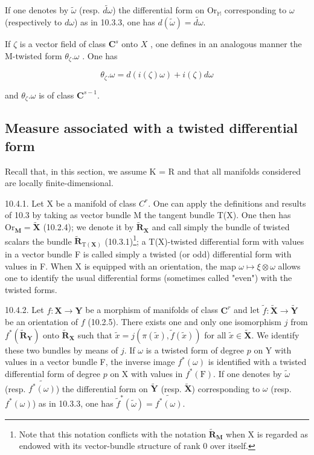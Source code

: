 If one denotes by \(\tilde{\omega}\) (resp. \(\widetilde{d\omega}\)) the differential form on \(\mathrm{Or}_{\mathbb{M}}\) corresponding to \(\omega\) (respectively to \(d\omega\)) as in 10.3.3, one has \(d(\tilde{\omega}) = \widetilde{d\omega}\).

If \(\zeta\) is a vector field of class \(\mathbf{C}^s\) onto \(X\) , one defines in an analogous manner the M-twisted form \(\theta_{\zeta}.\omega\) . One has

\[
\theta_ {\zeta}. \omega = d (i (\zeta) \omega) + i (\zeta) d \omega
\]

and \(\theta_{\zeta}.\omega\) is of class \(\mathbf{C}^{s - 1}\).

\subsection{Measure associated with a twisted differential form}

Recall that, in this section, we assume K = R and that all manifolds considered are locally finite-dimensional.

10.4.1. Let X be a manifold of class \(C^{r}\). One can apply the definitions and results of 10.3 by taking as vector bundle M the tangent bundle T(X). One then has \(\mathrm{Or}_{\mathbf{M}} = \tilde{\mathbf{X}}\) (10.2.4); we denote it by \(\tilde{\mathbf{R}}_{\mathbf{X}}\) and call simply the bundle of twisted scalars the bundle \(\tilde{\mathbf{R}}_{\mathrm{T}(\mathbf{X})}\) (10.3.1)\footnote{Note that this notation conflicts with the notation \(\widetilde{\mathbf{R}}_{\mathbf{M}}\) when X is regarded as endowed with its vector-bundle structure of rank 0 over itself.}; a T(X)-twisted differential form with values in a vector bundle F is called simply a twisted (or odd) differential form with values in F. When X is equipped with an orientation, the map \(\omega \mapsto \xi \otimes \omega\) allows one to identify the usual differential forms (sometimes called "even") with the twisted forms.

10.4.2. Let \(f\colon\mathbf{X}\to\mathbf{Y}\) be a morphism of manifolds of class \(\mathbf{C}^{r}\) and let \(\tilde{f}\colon\tilde{\mathbf{X}}\to\tilde{\mathbf{Y}}\) be an orientation of \(f\) (10.2.5). There exists one and only one isomorphism \(j\) from \(f^{*}(\widetilde{\mathbf{R}}_{\mathbf{Y}})\) onto \(\widetilde{\mathbf{R}}_{\mathbf{X}}\) such that \(\tilde{x}=j(\pi(\tilde{x}),\tilde{f}(\tilde{x}))\) for all \(\tilde{x}\in\tilde{\mathbf{X}}\). We identify these two bundles by means of \(j\). If \(\omega\) is a twisted form of degree \(p\) on Y with values in a vector bundle F, the inverse image \(f^{*}(\omega)\) is identified with a twisted differential form of degree \(p\) on X with values in \(f^{*}(\mathrm{F})\). If one denotes by \(\tilde{\omega}\) (resp. \(\widetilde{f^{*}(\omega)}\)) the differential form on \(\tilde{\mathbf{Y}}\) (resp. \(\tilde{\mathbf{X}}\)) corresponding to \(\omega\) (resp. \(f^{*}(\omega)\)) as in 10.3.3, one has \(\tilde{f}^{*}(\tilde{\omega})=\widetilde{f^{*}(\omega)}\).

